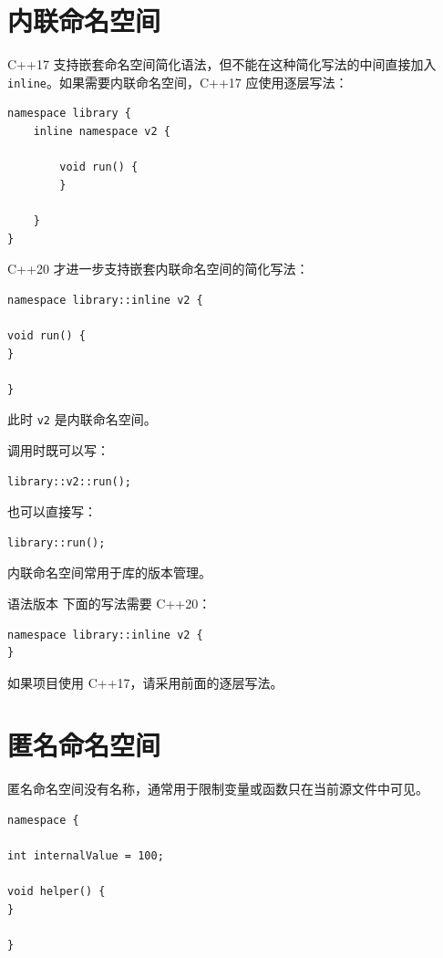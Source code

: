 \documentclass[UTF8,12pt,a4paper]{ctexart}
\begin{document}
\section{内联命名空间}

C++17 支持嵌套命名空间简化语法，但不能在这种简化写法的中间直接加入
\texttt{inline}。如果需要内联命名空间，C++17 应使用逐层写法：

\begin{lstlisting}
namespace library {
    inline namespace v2 {

        void run() {
        }

    }
}
\end{lstlisting}

C++20 才进一步支持嵌套内联命名空间的简化写法：

\begin{lstlisting}
namespace library::inline v2 {

void run() {
}

}
\end{lstlisting}

此时 \texttt{v2} 是内联命名空间。

调用时既可以写：

\begin{lstlisting}
library::v2::run();
\end{lstlisting}

也可以直接写：

\begin{lstlisting}
library::run();
\end{lstlisting}

内联命名空间常用于库的版本管理。

\begin{warningbox}{语法版本}
下面的写法需要 C++20：

\begin{lstlisting}
namespace library::inline v2 {
}
\end{lstlisting}

如果项目使用 C++17，请采用前面的逐层写法。
\end{warningbox}

\section{匿名命名空间}

匿名命名空间没有名称，通常用于限制变量或函数只在当前源文件中可见。

\begin{lstlisting}
namespace {

int internalValue = 100;

void helper() {
}

}
\end{lstlisting}
\end{document}
